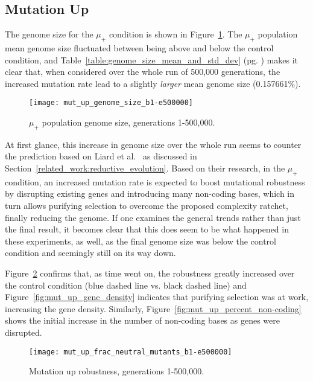\subsection{Mutation Up}
The genome size for the $\mu_+$ condition is shown in Figure~\ref{fig:mut_up_genome_size}. The $\mu_+$ population mean genome size fluctuated between being above and below the control condition, and Table~\ref{table:genome_size_mean_and_std_dev} (pg. \pageref{table:genome_size_mean_and_std_dev}) makes it clear that, when considered over the whole run of 500,000 generations, the increased mutation rate lead to a slightly \textit{larger} mean genome size (0.157661\%). 
\begin{figure}[H]
	\centering
	\texttt{[image: mut\_up\_genome\_size\_b1-e500000]}
	\caption[Mutation down genome size]{$\mu_+$ population genome size, generations 1-500,000.}
	\label{fig:mut_up_genome_size}
\end{figure}

At first glance, this increase in genome size over the whole run seems to counter the prediction based on Liard et al.~\cite{Liard.2018} as discussed in Section~\ref{related_work:reductive_evolution}. Based on their research, in the $\mu_+$ condition, an increased mutation rate is expected to boost mutational robustness by disrupting existing genes and introducing many non-coding bases, which in turn allows purifying selection to overcome the proposed complexity ratchet, finally reducing the genome. If one examines the general trends rather than just the final result, it becomes clear that this does seem to be what happened in these experiments, as well, as the final genome size was below the control condition and seemingly still on its way down. 

Figure~\ref{fig:mut_up_robustness} confirms that, as time went on, the robustness greatly increased over the control condition (blue dashed line vs. black dashed line) and Figure~\ref{fig:mut_up_gene_density} indicates that purifying selection was at work, increasing the gene density. Similarly, Figure~\ref{fig:mut_up_percent_non-coding} shows the initial increase in the number of non-coding bases as genes were disrupted. 

\begin{figure}[h]
	\centering
	\texttt{[image: mut\_up\_frac\_neutral\_mutants\_b1-e500000]}
	\caption[Mutation up robustness]{Mutation up robustness, generations 1-500,000.}
	\label{fig:mut_up_robustness}
\end{figure}

